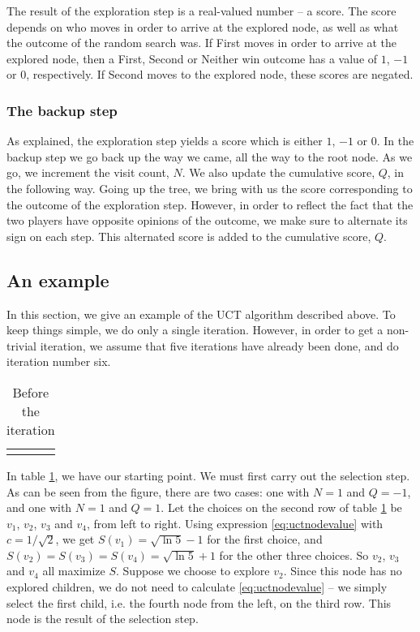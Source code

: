 The result of the exploration step is a real-valued number -- a score.
The score depends on who moves in order to arrive at the explored node, as well as what the outcome of the random search was.
If First moves in order to arrive at the explored node, then a First, Second or Neither win outcome has a value of $1$, $-1$ or $0$, respectively. If Second moves to the explored node, these scores are negated.

\subsubsection{The backup step}
\label{sec:backup_step_explanation}

As explained, the exploration step yields a score which is either $1$, $-1$ or $0$.
In the backup step we go back up the way we came, all the way to the root node.
As we go, we increment the visit count, $N$.
We also update the cumulative score, $Q$, in the following way.
Going up the tree, we bring with us the score corresponding to the outcome of the exploration step.
However, in order to reflect the fact that the two players have opposite opinions of the outcome, we make sure to alternate its sign on each step. This alternated score is added to the cumulative score, $Q$.

\subsection{An example}
In this section, we give an example of the UCT algorithm described above.
To keep things simple, we do only a single iteration.
However, in order to get a non-trivial iteration, we assume that five iterations have already been done, and do iteration number six.
\begin{center}
\def\arraystretch{5.5}
\begin{table}
\begin{tabular}{l}
  \def\svgwidth{\columnwidth} 
\end{tabular}
\caption{Before the iteration}
\label{tab:mcts_iteration_before}
\end{table}
\end{center}
In table \ref{tab:mcts_iteration_before}, we have our starting point.
We must first carry out the selection step. As can be seen from the figure, there are two cases: one with $N=1$ and $Q=-1$, and one with $N=1$ and $Q=1$.
Let the choices on the second row of table \ref{tab:mcts_iteration_before} be $v_1$, $v_2$, $v_3$ and $v_4$, from left to right.
Using expression \eqref{eq:uctnodevalue} with $c = 1/\sqrt{2}$, we get $S(v_1) = \sqrt{\ln{5}} - 1$ for the first choice, and $S(v_2) = S(v_3) = S(v_4) = \sqrt{\ln{5}} + 1$ for the other three choices.
So $v_2$, $v_3$ and $v_4$ all maximize $S$.
Suppose we choose to explore $v_2$. Since this node has no explored children, we do not need to calculate \eqref{eq:uctnodevalue} -- we simply select the first child, i.e. the fourth node from the left, on the third row.
This node is the result of the selection step.

